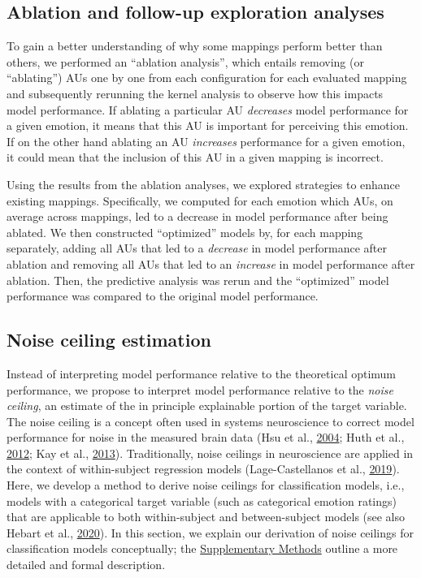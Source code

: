 \documentclass[12pt,american,a4paper,oneside,]{memoir} %
\begin{document}
\hypertarget{ablation-and-follow-up-exploration-analyses}{%
\subsection{Ablation and follow-up exploration analyses}\label{ablation-and-follow-up-exploration-analyses}}

To gain a better understanding of why some mappings perform better than others, we performed an ``ablation analysis'', which entails removing (or ``ablating'') AUs one by one from each configuration for each evaluated mapping and subsequently rerunning the kernel analysis to observe how this impacts model performance. If ablating a particular AU \emph{decreases} model performance for a given emotion, it means that this AU is important for perceiving this emotion. If on the other hand ablating an AU \emph{increases} performance for a given emotion, it could mean that the inclusion of this AU in a given mapping is incorrect.

Using the results from the ablation analyses, we explored strategies to enhance existing mappings. Specifically, we computed for each emotion which AUs, on average across mappings, led to a decrease in model performance after being ablated. We then constructed ``optimized'' models by, for each mapping separately, adding all AUs that led to a \emph{decrease} in model performance after ablation and removing all AUs that led to an \emph{increase} in model performance after ablation. Then, the predictive analysis was rerun and the ``optimized'' model performance was compared to the original model performance.

\hypertarget{hka-noise-ceiling}{%
\subsection{Noise ceiling estimation}\label{hka-noise-ceiling}}

Instead of interpreting model performance relative to the theoretical optimum performance, we propose to interpret model performance relative to the \emph{noise ceiling}, an estimate of the in principle explainable portion of the target variable. The noise ceiling is a concept often used in systems neuroscience to correct model performance for noise in the measured brain data (Hsu et al., \protect\hyperlink{ref-Hsu2004-hs}{2004}; Huth et al., \protect\hyperlink{ref-Huth2012-yc}{2012}; Kay et al., \protect\hyperlink{ref-Kay2013-ch}{2013}). Traditionally, noise ceilings in neuroscience are applied in the context of within-subject regression models (Lage-Castellanos et al., \protect\hyperlink{ref-lage2019methods}{2019}). Here, we develop a method to derive noise ceilings for classification models, i.e., models with a categorical target variable (such as categorical emotion ratings) that are applicable to both within-subject and between-subject models (see also Hebart et al., \protect\hyperlink{ref-Hebart2020-wp}{2020}). In this section, we explain our derivation of noise ceilings for classification models conceptually; the \protect\hyperlink{hypothesis-kernel-analysis-supplement}{Supplementary Methods} outline a more detailed and formal description.
\end{document}
